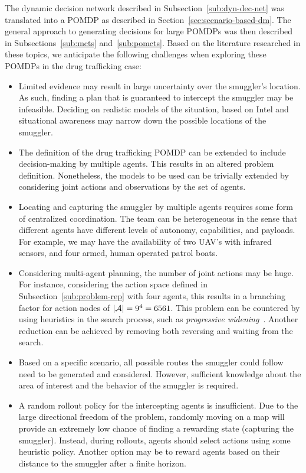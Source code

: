 \documentclass[conference]{IEEEtran}
\begin{document}
The dynamic decision network described in Subsection~\ref{sub:dyn-dec-net} was translated into a POMDP as described in Section~\ref{sec:scenario-based-dm}. The general approach to generating decisions for large POMDPs was then described in Subsections~\ref{sub:mcts} and~\ref{sub:pomcts}. Based on the literature researched in these topics, we anticipate the following challenges when exploring these POMDPs in the drug trafficking case:
\begin{itemize}
\item Limited evidence may result in large uncertainty over the smuggler's location. As such, finding a plan that is guaranteed to intercept the smuggler may be infeasible. Deciding on realistic models of the situation, based on Intel and situational awareness may narrow down the possible locations of the smuggler.
\item The definition of the drug trafficking POMDP can be extended to include decision-making by multiple agents. This results in an altered problem definition. Nonetheless, the models to be used can be trivially extended by considering joint actions and observations by the set of agents.
\item Locating and capturing the smuggler by multiple agents requires some form of centralized coordination. The team can be heterogeneous in the sense that different agents have different levels of autonomy, capabilities, and payloads. For example, we may have the availability of two UAV's with infrared sensors, and four armed, human operated patrol boats.
\item Considering multi-agent planning, the number of joint actions may be huge. For instance, considering the action space defined in Subsection~\ref{sub:problem-rep} with four agents, this results in a branching factor for action nodes of $\left\vert{\mathcal{A}}\right\vert=9^4=6561$. This problem can be countered by using heuristics in the search process, such as \emph{progressive widening}~\cite{chaslot2008progressive}. Another reduction can be achieved by removing both reversing \cite{realtime2014} and waiting from the search.
\item Based on a specific scenario, all possible routes the smuggler could follow need to be generated and considered. However, sufficient knowledge about the area of interest and the behavior of the smuggler is required.
\item A random rollout policy for the intercepting agents is insufficient. Due to the large directional freedom of the problem, randomly moving on a map will provide an extremely low chance of finding a rewarding state (\ie capturing the smuggler). Instead, during rollouts, agents should select actions using some heuristic policy. Another option may be to reward agents based on their distance to the smuggler after a finite horizon.
\end{itemize}



\end{document}
